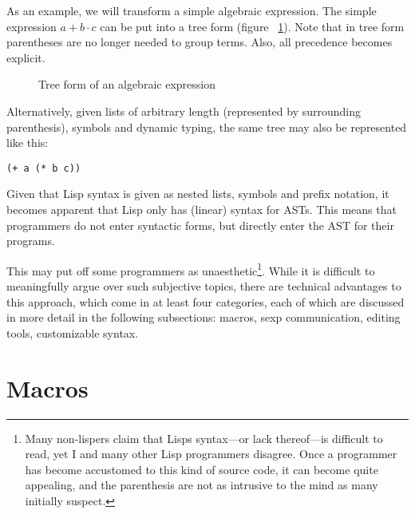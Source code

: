 \documentclass[a4paper,10pt,twoside]{report}
\begin{document}
As an example, we will transform a simple algebraic expression.  The simple
expression \(a + b \cdot c\) can be put into a tree form (figure
~\ref{fig:simple-tree}).  Note that in tree form parentheses are no longer
needed to group terms.  Also, all precedence becomes explicit.

\begin{figure}[h]
  \centering
  
  \caption{Tree form of an algebraic expression}
  \label{fig:simple-tree}
\end{figure}

Alternatively, given lists of arbitrary length (represented by surrounding
parenthesis), symbols and dynamic typing, the same tree may also be represented
like this:


\begin{lstlisting}[style=lispinline]
(+ a (* b c))
\end{lstlisting}

Given that Lisp syntax is given as nested lists, symbols and prefix notation, it
becomes apparent that Lisp only has (linear) syntax for ASTs.  This means that
programmers do not enter syntactic forms, but directly enter the AST for their
programs.

This may put off some programmers as unaesthetic\footnote{Many non-lispers claim
  that Lisps syntax---or lack thereof---is difficult to read, yet I and many
  other Lisp programmers disagree.  Once a programmer has become accustomed to
  this kind of source code, it can become quite appealing, and the parenthesis
  are not as intrusive to the mind as many initially suspect.}.  While it is
difficult to meaningfully argue over such subjective topics, there are technical
advantages to this approach, which come in at least four categories, each of
which are discussed in more detail in the following subsections: macros, sexp
communication, editing tools, customizable syntax.

\section{Macros}
\label{subsec:macros}
\end{document}
